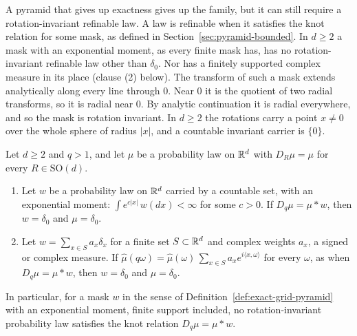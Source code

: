 A pyramid that gives up exactness gives up the family, but it can still require a
rotation-invariant refinable law. A law is refinable when it satisfies the knot relation for some
mask, as defined in Section~\ref{sec:pyramid-bounded}. In $d \ge 2$ a mask with an exponential
moment, as every finite mask has, has no rotation-invariant refinable law other than $\delta_0$. Nor
has a finitely supported complex measure in its place (clause (2) below). The transform of such a mask extends analytically
along every line through $0$. Near $0$ it is the quotient of two radial transforms, so it is radial
near $0$. By analytic continuation it is radial everywhere, and so the mask is rotation invariant.
In $d \ge 2$ the rotations carry a point $x \ne 0$ over the whole sphere of radius $|x|$, and a
countable invariant carrier is $\{0\}$.

\begin{proposition}
\label{prop:no-isotropic-refinable-finite-mask}

Let $d \ge 2$ and $q > 1$, and let $\mu$ be a probability law on $\mathbb{R}^d$ with $D_R\mu = \mu$ for
every $R \in \mathrm{SO}(d)$.
\begin{enumerate}
\item Let $w$ be a probability law on $\mathbb{R}^d$ carried by a countable set, with an exponential
moment: $\int e^{c|x|}\,w(dx) < \infty$ for some $c > 0$. If $D_q\mu = \mu * w$, then
$w = \delta_0$ and $\mu = \delta_0$.
\item Let $w = \sum_{x \in S}a_x\delta_x$ for a finite set $S \subset \mathbb{R}^d$ and complex weights
$a_x$, a signed or complex measure. If $\widehat\mu(q\omega) = \widehat\mu(\omega)\,
\sum_{x \in S}a_xe^{i\langle x, \omega\rangle}$ for every $\omega$, as when $D_q\mu = \mu * w$,
then $w = \delta_0$ and $\mu = \delta_0$.
\end{enumerate}
In particular, for a mask $w$ in the sense of Definition~\ref{def:exact-grid-pyramid} with an
exponential moment, finite support included, no rotation-invariant probability law satisfies the knot
relation $D_q\mu = \mu * w$.
\end{proposition}

